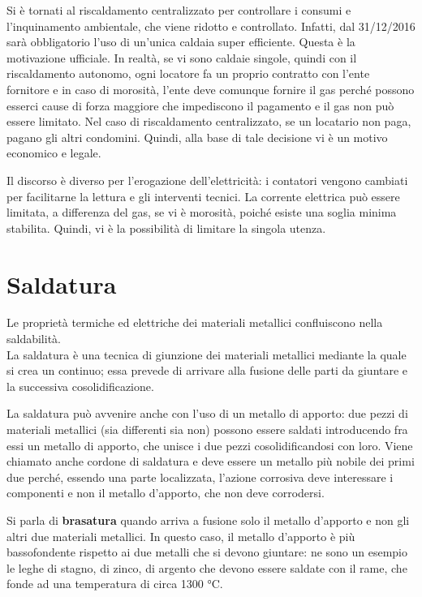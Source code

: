 Si è tornati al riscaldamento centralizzato per controllare i consumi e l’inquinamento ambientale, che viene ridotto e controllato. Infatti, dal 31/12/2016 sarà obbligatorio l’uso di un’unica caldaia super efficiente. Questa è la motivazione ufficiale. In realtà, se vi sono caldaie singole, quindi con il riscaldamento autonomo, ogni locatore fa un proprio contratto con l’ente fornitore e in caso di morosità, l’ente deve comunque fornire il gas perché possono esserci cause di forza maggiore che impediscono il pagamento e il gas non può essere limitato. Nel caso di riscaldamento centralizzato, se un locatario non paga, pagano gli altri condomini. Quindi, alla base di tale decisione vi è un motivo economico e legale.

Il discorso è diverso per l’erogazione dell’elettricità: i contatori vengono cambiati per facilitarne la lettura e gli interventi tecnici. La corrente elettrica può essere limitata, a differenza del gas, se vi è morosità, poiché esiste una soglia minima stabilita. Quindi, vi è la possibilità di limitare la singola utenza.

\section{Saldatura} %

Le proprietà termiche ed elettriche dei materiali metallici confluiscono nella saldabilità.\\
La saldatura è una tecnica di giunzione dei materiali metallici mediante la quale si crea un continuo; essa prevede di arrivare alla fusione delle parti da giuntare e la successiva cosolidificazione.

La saldatura può avvenire anche con l’uso di un metallo di apporto: due pezzi di materiali metallici
(sia differenti sia non) possono essere saldati introducendo fra essi un metallo di apporto, che unisce i due pezzi cosolidificandosi con loro. Viene chiamato anche cordone di saldatura e deve essere un metallo più nobile dei primi due perché, essendo una parte localizzata, l’azione corrosiva deve interessare i componenti e non il metallo d’apporto, che non deve corrodersi.

Si parla di \textbf{brasatura} quando arriva a fusione solo il metallo d’apporto e non gli altri due materiali metallici. In questo caso, il metallo d’apporto è più bassofondente rispetto ai due metalli che si devono giuntare: ne sono un esempio le leghe di stagno, di zinco, di argento che devono essere saldate con il rame, che fonde ad una temperatura di circa 1300 °C.

